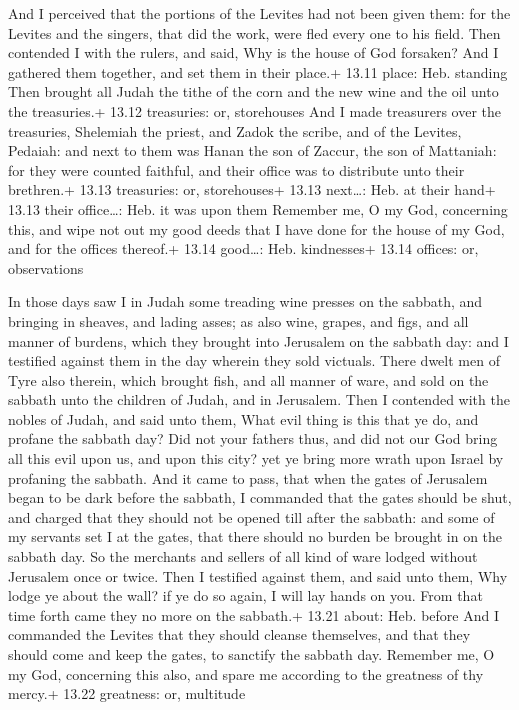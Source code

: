  And I perceived that the portions of the Levites had not
been given them: for the Levites and the singers, that did the work,
were fled every one to his field.  Then contended I with
the rulers, and said, Why is the house of God forsaken? And I gathered
them together, and set them in their place.+ 13.11 place: Heb. standing
 Then brought all Judah the tithe of the corn and the new
wine and the oil unto the treasuries.+ 13.12 treasuries: or, storehouses
 And I made treasurers over the treasuries, Shelemiah the
priest, and Zadok the scribe, and of the Levites, Pedaiah: and next to
them was Hanan the son of Zaccur, the son of Mattaniah: for they were
counted faithful, and their office was to distribute unto their
brethren.+ 13.13 treasuries: or, storehouses+ 13.13 next\ldots: Heb. at
their hand+ 13.13 their office\ldots: Heb. it was upon them
 Remember me, O my God, concerning this, and wipe not out
my good deeds that I have done for the house of my God, and for the
offices thereof.+ 13.14 good\ldots: Heb. kindnesses+ 13.14 offices: or,
observations

 In those days saw I in Judah some treading wine presses
on the sabbath, and bringing in sheaves, and lading asses; as also wine,
grapes, and figs, and all manner of burdens, which they brought into
Jerusalem on the sabbath day: and I testified against them in the day
wherein they sold victuals.  There dwelt men of Tyre also
therein, which brought fish, and all manner of ware, and sold on the
sabbath unto the children of Judah, and in Jerusalem.  Then
I contended with the nobles of Judah, and said unto them, What evil
thing is this that ye do, and profane the sabbath day?  Did
not your fathers thus, and did not our God bring all this evil upon us,
and upon this city? yet ye bring more wrath upon Israel by profaning the
sabbath.  And it came to pass, that when the gates of
Jerusalem began to be dark before the sabbath, I commanded that the
gates should be shut, and charged that they should not be opened till
after the sabbath: and some of my servants set I at the gates, that
there should no burden be brought in on the sabbath day. 
So the merchants and sellers of all kind of ware lodged without
Jerusalem once or twice.  Then I testified against them,
and said unto them, Why lodge ye about the wall? if ye do so again, I
will lay hands on you. From that time forth came they no more on the
sabbath.+ 13.21 about: Heb. before  And I commanded the
Levites that they should cleanse themselves, and that they should come
and keep the gates, to sanctify the sabbath day. Remember me, O my God,
concerning this also, and spare me according to the greatness of thy
mercy.+ 13.22 greatness: or, multitude

